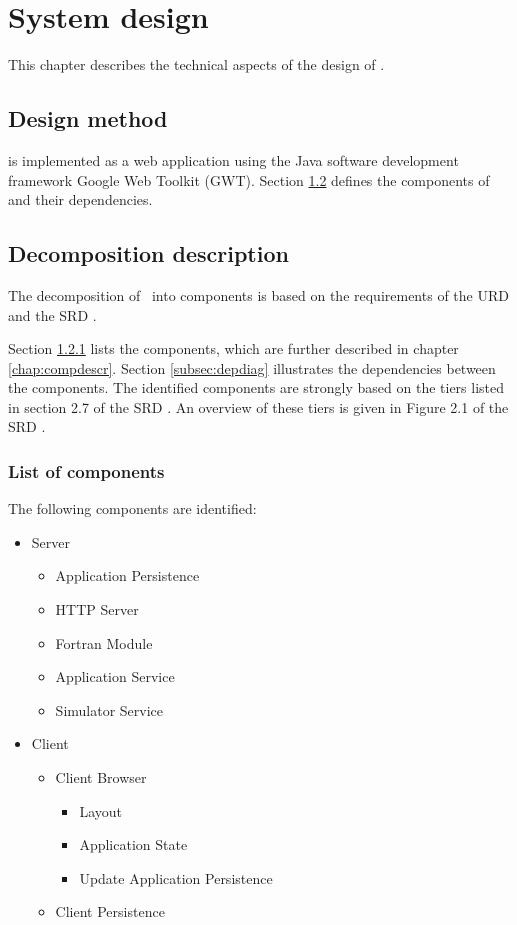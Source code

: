 \chapter{System design}
\label{chap:systdesign}
This chapter describes the technical aspects of the design of \projectname.

\section{Design method}
\projectname{} is implemented as a web application using the Java software development framework Google Web Toolkit (GWT). Section \ref{sec:decompdescr} defines the components of \projectname{} and their dependencies.


\section{Decomposition description}
\label{sec:decompdescr}
The decomposition of \projectname\ into components is based on the requirements of the URD \cite{urd} and the SRD \cite{srd}.

\fpstartparagraph{} Section \ref{subsec:complist} lists the components, which are further described in chapter \ref{chap:compdescr}. Section \ref{subsec:depdiag} illustrates the dependencies between the components. The identified components are strongly based on the tiers listed in section 2.7 of the SRD \cite{srd}. An overview of these tiers is given in Figure 2.1 of the SRD \cite{srd}.

\subsection{List of components}
\label{subsec:complist}
The following components are identiﬁed:

\begin{itemize}
\item Server
\begin{itemize}
\item Application Persistence
\item HTTP Server
\item Fortran Module
\item Application Service
\item Simulator Service
\end{itemize}
\item Client
\begin{itemize}
\item Client Browser
\begin{itemize}
\item Layout
\item Application State
\item Update Application Persistence
\end{itemize}
\item Client Persistence
\end{itemize}
\end{itemize}

